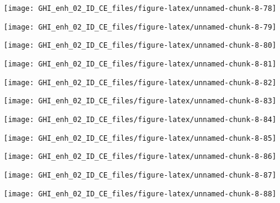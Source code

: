\documentclass[
  10pt,
  a4paper,oneside]{article}
\begin{document}
\begin{center}\texttt{[image: GHI\_enh\_02\_ID\_CE\_files/figure-latex/unnamed-chunk-8-78]} \end{center}

\begin{center}\texttt{[image: GHI\_enh\_02\_ID\_CE\_files/figure-latex/unnamed-chunk-8-79]} \end{center}

\begin{center}\texttt{[image: GHI\_enh\_02\_ID\_CE\_files/figure-latex/unnamed-chunk-8-80]} \end{center}

\begin{center}\texttt{[image: GHI\_enh\_02\_ID\_CE\_files/figure-latex/unnamed-chunk-8-81]} \end{center}

\begin{center}\texttt{[image: GHI\_enh\_02\_ID\_CE\_files/figure-latex/unnamed-chunk-8-82]} \end{center}

\begin{center}\texttt{[image: GHI\_enh\_02\_ID\_CE\_files/figure-latex/unnamed-chunk-8-83]} \end{center}

\begin{center}\texttt{[image: GHI\_enh\_02\_ID\_CE\_files/figure-latex/unnamed-chunk-8-84]} \end{center}

\begin{center}\texttt{[image: GHI\_enh\_02\_ID\_CE\_files/figure-latex/unnamed-chunk-8-85]} \end{center}

\begin{center}\texttt{[image: GHI\_enh\_02\_ID\_CE\_files/figure-latex/unnamed-chunk-8-86]} \end{center}

\begin{center}\texttt{[image: GHI\_enh\_02\_ID\_CE\_files/figure-latex/unnamed-chunk-8-87]} \end{center}

\begin{center}\texttt{[image: GHI\_enh\_02\_ID\_CE\_files/figure-latex/unnamed-chunk-8-88]} \end{center}
\end{document}
